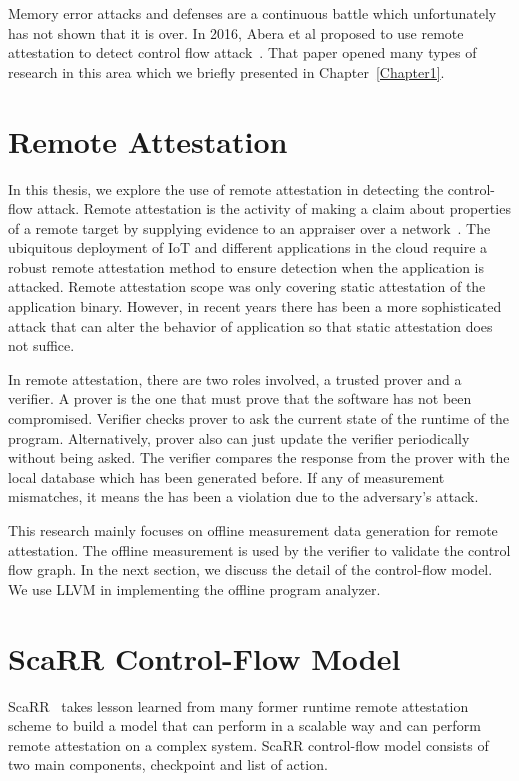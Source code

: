Memory error attacks and defenses are a continuous battle which unfortunately
has not shown that it is over. In 2016, Abera et al proposed to use remote
attestation to detect control flow
attack~\cite{aberaCFLATControlFlowAttestation2016}. That paper opened many types
of research in this area which we briefly presented in Chapter~\ref{Chapter1}.
 
\section{Remote Attestation}
\label{sec:remote-attestation}

In this thesis, we explore the use of remote attestation in detecting the
control-flow attack. Remote attestation is the activity of making a claim about
properties of a remote target by supplying evidence to an appraiser over a
network~\cite{cokerPrinciplesRemoteAttestation2011a}. The ubiquitous deployment
of IoT and different applications in the cloud require a robust remote
attestation method to ensure detection when the application is attacked.  Remote
attestation scope was only covering static attestation of the application
binary. However, in recent years there has been a more sophisticated attack
that can alter the behavior of application so that static attestation does not
suffice. 

In remote attestation, there are two roles involved, a trusted prover and a
verifier. A prover is the one that must prove that the software has not been
compromised. Verifier checks prover to ask the current state of the runtime of
the program. Alternatively, prover also can just update the verifier
periodically without being asked. The verifier compares the response from the
prover with the local database which has been generated before. If any of
measurement mismatches, it means the has been a violation due to the adversary's
attack.

This research mainly focuses on offline measurement data generation for remote
attestation. The offline measurement is used by the verifier to validate the
control flow graph. In the next section, we discuss the detail of the
control-flow model. We use LLVM in implementing the offline program analyzer.

\section{ScaRR Control-Flow Model} 
\label{sec:scarr-model}

ScaRR~\cite{toffaliniScaRRScalableRuntime2019} takes lesson learned from many
former runtime remote attestation scheme to build a model that can perform in a
scalable way and can perform remote attestation on a complex system. ScaRR
control-flow model consists of two main components, checkpoint and list of
action. 


